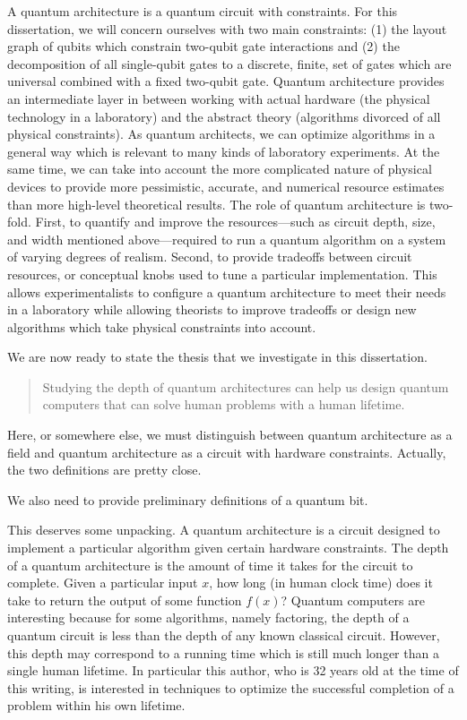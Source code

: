 A quantum architecture is a quantum circuit with constraints. For this
dissertation, we will concern ourselves with two main constraints:
(1) the layout graph of qubits which constrain two-qubit gate interactions and
(2) the decomposition of all single-qubit gates to a discrete, finite,
set of gates which are universal combined with a fixed two-qubit gate.
Quantum architecture provides an intermediate layer in between working
with actual hardware (the physical technology in a laboratory) and the
abstract theory (algorithms divorced of all physical constraints).
As quantum architects, we can optimize algorithms in a general way which
is relevant to many kinds of laboratory experiments. At the same time,
we can take into account the more complicated nature of physical devices
to provide more pessimistic, accurate, and numerical resource estimates than more
high-level theoretical results.
The role of quantum architecture is two-fold. First,
to quantify and improve the resources---such as circuit depth,
size, and width mentioned above---required to run a quantum
algorithm on a system of varying degrees of realism. Second, to provide
tradeoffs between circuit resources, or conceptual knobs used to tune a
particular implementation. This allows experimentalists to configure a
quantum architecture to meet their needs in a laboratory while allowing
theorists to improve tradeoffs or design new algorithms which take
physical constraints into account.


We are now ready to state the thesis that we investigate in this dissertation.

\begin{quote}
Studying the depth of quantum architectures can help us design quantum computers that can solve
human problems with a human lifetime.
\end{quote}

Here, or somewhere else, we must distinguish between quantum architecture as a field and quantum architecture as a
circuit with hardware constraints. Actually, the two definitions are pretty close.

We also need to provide preliminary definitions of a quantum bit.

This deserves some unpacking. A quantum architecture is a circuit designed to implement a particular algorithm given certain
hardware constraints. The depth of a quantum architecture is the amount of time it takes for the circuit to complete.
Given a particular input $x$, how long (in human clock time) does it take to return the output of some function $f(x)$?
Quantum computers are interesting because for some algorithms, namely factoring, the depth of a quantum circuit is
less than the depth of any known classical circuit. However, this depth may correspond to a running time which is
still much longer than a single human lifetime. In particular this author, who is 32 years old at the time of this
writing, is interested in techniques to optimize the successful completion of a problem within his own lifetime.

